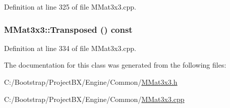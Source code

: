 Definition at line 325 of file MMat3x3.cpp.\hypertarget{class_m_mat3x3_a01f61e6a6c501a6d777a6d8c980736d}{
\subsubsection[{Transposed}]{ MMat3x3::Transposed () const}}
\label{class_m_mat3x3_a01f61e6a6c501a6d777a6d8c980736d}




Definition at line 334 of file MMat3x3.cpp.

The documentation for this class was generated from the following files:\begin{CompactItemize}
\item 
C:/Bootstrap/ProjectBX/Engine/Common/\hyperlink{_m_mat3x3_8h}{MMat3x3.h}\item 
C:/Bootstrap/ProjectBX/Engine/Common/\hyperlink{_m_mat3x3_8cpp}{MMat3x3.cpp}\end{CompactItemize}

